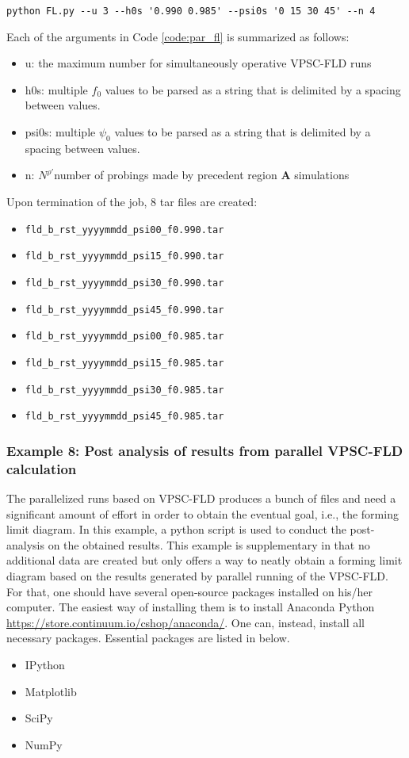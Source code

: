 \documentclass[12pt]{amsart}
\begin{document}
\begin{lstlisting}[style=sh, caption=An example use of FL.py, label={code:par_fl}]
  python FL.py --u 3 --h0s '0.990 0.985' --psi0s '0 15 30 45' --n 4
\end{lstlisting}
Each of the arguments in Code \ref{code:par_fl} is summarized as follows:
\begin{itemize}
\item u: the maximum number for simultaneously operative VPSC-FLD runs
\item h0s: multiple $f_0$ values to be parsed as a string that is delimited by a spacing between values.
\item psi0s: multiple $\psi_0$ values to be parsed as a string that is delimited by a spacing between values.
\item n: $N^{\rho'}$number of probings made by precedent region \textbf{A} simulations
\end{itemize}
Upon termination of the job, 8 tar files are created:
\begin{itemize}
\item \verb$fld_b_rst_yyyymmdd_psi00_f0.990.tar$
\item \verb$fld_b_rst_yyyymmdd_psi15_f0.990.tar$
\item \verb$fld_b_rst_yyyymmdd_psi30_f0.990.tar$
\item \verb$fld_b_rst_yyyymmdd_psi45_f0.990.tar$
\item \verb$fld_b_rst_yyyymmdd_psi00_f0.985.tar$
\item \verb$fld_b_rst_yyyymmdd_psi15_f0.985.tar$
\item \verb$fld_b_rst_yyyymmdd_psi30_f0.985.tar$
\item \verb$fld_b_rst_yyyymmdd_psi45_f0.985.tar$
\end{itemize}

\subsubsection{Example 8: Post analysis of results from parallel VPSC-FLD calculation}
\label{sec:par_postanalysis}
The parallelized runs based on VPSC-FLD produces a bunch of files and need a significant amount of effort in order to obtain the eventual goal, i.e., the forming limit diagram.
In this example, a python script is used to conduct the post-analysis on the obtained results.
This example is supplementary in that no additional data are created but only offers a way to neatly obtain a forming limit diagram based on the results generated by parallel running of the VPSC-FLD.
For that, one should have several open-source packages installed on his/her computer.
The easiest way of installing them is to install Anaconda Python \url{https://store.continuum.io/cshop/anaconda/}.
One can, instead, install all necessary packages.
Essential packages are listed in below.
\begin{itemize}
\item IPython
\item Matplotlib
\item SciPy
\item NumPy
\end{itemize}
\end{document}
